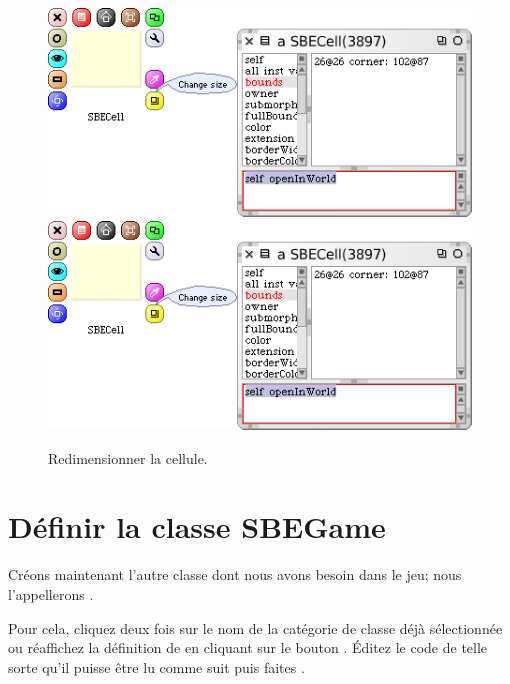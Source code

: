 \documentclass[a4paper,10pt,twoside]{book}
\begin{document}
\begin{figure}[htbp]
\centering
\ifluluelse
	{\includegraphics[width=\textwidth]{SBECellResize} }
	{\includegraphics[scale=0.7]{SBECellResize} }
\caption{Redimensionner la cellule.\label{fig:cellresize}}
\end{figure}


\section{Définir la classe SBEGame}

Créons maintenant l'autre classe dont nous avons besoin dans le jeu; nous l'appellerons .

Pour cela, cliquez deux fois sur le nom de la catégorie de classe
déjà sélectionnée ou réaffichez la définition de  en cliquant sur le bouton .
Éditez le code de telle sorte qu'il puisse \^etre lu comme suit puis faites .
\end{document}
